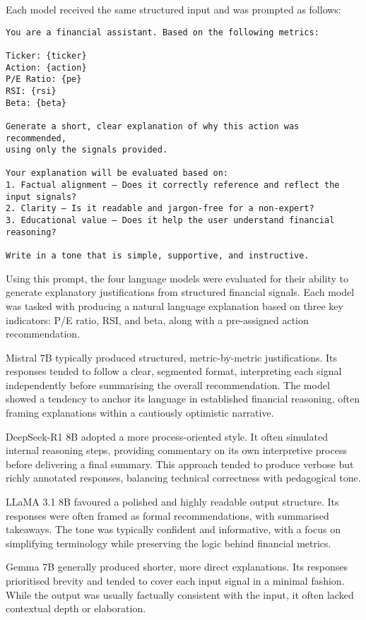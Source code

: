 Each model received the same structured input and was prompted as follows:

\begin{verbatim}
You are a financial assistant. Based on the following metrics:

Ticker: {ticker}
Action: {action}
P/E Ratio: {pe}
RSI: {rsi}
Beta: {beta}

Generate a short, clear explanation of why this action was recommended,
using only the signals provided.

Your explanation will be evaluated based on:
1. Factual alignment – Does it correctly reference and reflect the input signals?
2. Clarity – Is it readable and jargon-free for a non-expert?
3. Educational value – Does it help the user understand financial reasoning?

Write in a tone that is simple, supportive, and instructive.
\end{verbatim}

Using this prompt, the four language models were evaluated for their ability to generate explanatory justifications from structured financial signals. Each model was tasked with producing a natural language explanation based on three key indicators: P/E ratio, RSI, and beta, along with a pre-assigned action recommendation.

Mistral 7B typically produced structured, metric-by-metric justifications. Its responses tended to follow a clear, segmented format, interpreting each signal independently before summarising the overall recommendation. The model showed a tendency to anchor its language in established financial reasoning, often framing explanations within a cautiously optimistic narrative.

DeepSeek-R1 8B adopted a more process-oriented style. It often simulated internal reasoning steps, providing commentary on its own interpretive process before delivering a final summary. This approach tended to produce verbose but richly annotated responses, balancing technical correctness with pedagogical tone.

LLaMA 3.1 8B favoured a polished and highly readable output structure. Its responses were often framed as formal recommendations, with summarised takeaways. The tone was typically confident and informative, with a focus on simplifying terminology while preserving the logic behind financial metrics.

Gemma 7B generally produced shorter, more direct explanations. Its responses prioritised brevity and tended to cover each input signal in a minimal fashion. While the output was usually factually consistent with the input, it often lacked contextual depth or elaboration.

